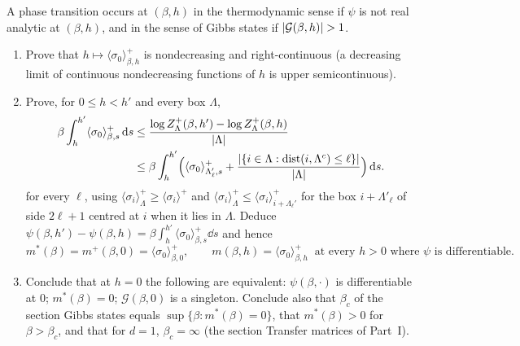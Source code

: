 \begin{exercise}
A phase transition occurs at $(\beta,h)$ in the thermodynamic sense if
$\psi$ is not real analytic at $(\beta,h)$, and in the sense of Gibbs states
if $\left\lvert \mathcal G(\beta,h)\right\rvert>1$.
\begin{enumerate}[label=(\alph*)]
\item Prove that $h\mapsto\langle\sigma_0\rangle^+_{\beta,h}$ is
nondecreasing and right-continuous (a decreasing limit of continuous
nondecreasing functions of $h$ is upper semicontinuous).
\item Prove, for $0\le h<h'$ and every box $\Lambda$,
\[
\begin{aligned}
 \beta\int_h^{h'}\langle\sigma_0\rangle^+_{\beta,s}\,\mathrm d s
 &\le\frac{\log Z^+_\Lambda(\beta,h')-\log Z^+_\Lambda(\beta,h)}{\left\lvert \Lambda\right\rvert}\\
 &\le\beta\int_h^{h'}\Bigl(\langle\sigma_0\rangle^+_{\Lambda'_\ell,s}
 +\frac{\left\lvert \{i\in\Lambda:\operatorname{dist}(i,\Lambda^c)\le\ell\}\right\rvert}{\left\lvert \Lambda\right\rvert}\Bigr)\,\mathrm d s .
\end{aligned}
\]
for every $\ell$, using $\langle\sigma_i\rangle^+_\Lambda\ge\langle\sigma_i\rangle^+$
and $\langle\sigma_i\rangle^+_\Lambda\le\langle\sigma_i\rangle^+_{i+\Lambda_\ell'}$
for the box $i+\Lambda'_\ell$ of side $2\ell+1$ centred at $i$ when it lies in
$\Lambda$.  Deduce $\psi(\beta,h')-\psi(\beta,h)=\beta\int_h^{h'}\langle\sigma_0\rangle^+_{\beta,s}\dd s$
and hence
\[
 m^*(\beta)=m^+(\beta,0)=\langle\sigma_0\rangle^+_{\beta,0},\qquad
 m(\beta,h)=\langle\sigma_0\rangle^+_{\beta,h}\ \text{ at every $h>0$ where $\psi$ is differentiable}.
\]
\item Conclude that at $h=0$ the following are equivalent: $\psi(\beta,\cdot)$
is differentiable at $0$; $m^*(\beta)=0$; $\mathcal G(\beta,0)$ is a
singleton.  Conclude also that $\beta_c$ of the section Gibbs states equals
$\sup\{\beta:m^*(\beta)=0\}$, that $m^*(\beta)>0$ for $\beta>\beta_c$, and that
for $d=1$, $\beta_c=\infty$ (the section Transfer matrices of Part~I).
\end{enumerate}
\end{exercise}

